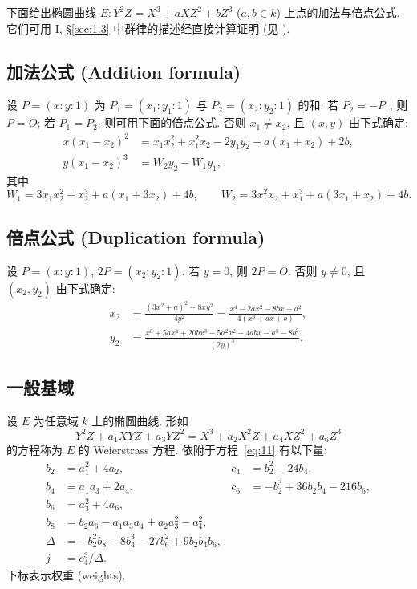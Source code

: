 下面给出椭圆曲线 $E\colon Y^2Z = X^3 + aXZ^2 + bZ^3$ ($a,b\in k$) 上点的加法与倍点公式. 它们可用 I, \S\ref{sec:1.3} 中群律的描述经直接计算证明 (见 \cite[Formulary]{cassels1991}).

\subsection*{加法公式 (Addition formula)}
设 $P = (x:y:1)$ 为 $P_1 = (x_1:y_1:1)$ 与 $P_2 = (x_2:y_2:1)$ 的和. 若 $P_2 = -P_1$, 则 $P = O$; 若 $P_1 = P_2$, 则可用下面的倍点公式. 否则 $x_1\neq x_2$, 且 $(x,y)$ 由下式确定:
\begin{align*}
x(x_1-x_2)^2 &= x_1x_2^2 + x_1^2x_2 - 2y_1y_2 + a(x_1+x_2) + 2b,\\
y(x_1-x_2)^3 &= W_2y_2 - W_1y_1,
\end{align*}
其中
\[
W_1 = 3x_1x_2^2 + x_2^3 + a(x_1+3x_2) + 4b, \qquad
W_2 = 3x_1^2x_2 + x_1^3 + a(3x_1+x_2) + 4b.
\]

\subsection*{倍点公式 (Duplication formula)}
\label{eq:dup}
设 $P = (x:y:1)$, $2P = (x_2:y_2:1)$. 若 $y = 0$, 则 $2P = O$. 否则 $y\neq 0$, 且 $(x_2,y_2)$ 由下式确定:
\begin{align*}
x_2 &= \frac{(3x^2+a)^2 - 8xy^2}{4y^2} = \frac{x^4 - 2ax^2 - 8bx + a^2}{4(x^3+ax+b)},\\
y_2 &= \frac{x^6 + 5ax^4 + 20bx^3 - 5a^2x^2 - 4abx - a^3 - 8b^2}{(2y)^3}.
\end{align*}

\subsection*{一般基域}

设 $E$ 为任意域 $k$ 上的椭圆曲线. 形如
\begin{equation} \label{eq:11}
Y^2Z + a_1XYZ + a_3YZ^2 = X^3 + a_2X^2Z + a_4XZ^2 + a_6Z^3
\tag{11}
\end{equation}
的方程称为 $E$ 的 Weierstrass 方程. 依附于方程~\eqref{eq:11} 有以下量:
\[
\begin{aligned}
b_2 &= a_1^2 + 4a_2, & c_4 &= b_2^2 - 24b_4,\\
b_4 &= a_1a_3 + 2a_4, & c_6 &= -b_2^3 + 36b_2b_4 - 216b_6,\\
b_6 &= a_3^2 + 4a_6,\\
b_8 &= b_2a_6 - a_1a_3a_4 + a_2a_3^2 - a_4^2,\\
\Delta &= -b_2^2b_8 - 8b_4^3 - 27b_6^2 + 9b_2b_4b_6,\\
j &= c_4^3/\Delta.
\end{aligned}
\]
下标表示权重 (weights).

